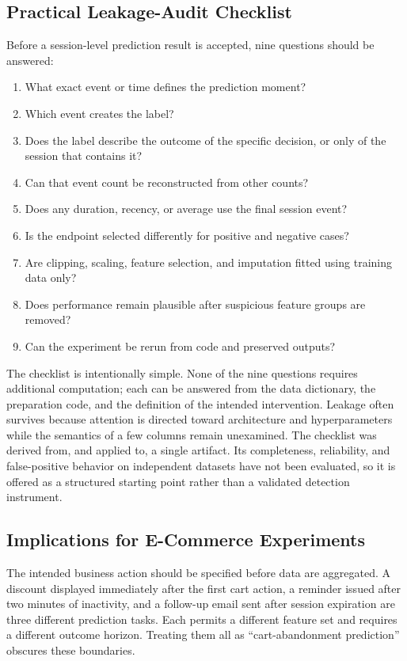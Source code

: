 \documentclass[conference, letterpaper]{IEEEtran}
\begin{document}
\subsection{Practical Leakage-Audit Checklist}
Before a session-level prediction result is accepted, nine questions should be answered:
\begin{enumerate}
    \item What exact event or time defines the prediction moment?
    \item Which event creates the label?
    \item Does the label describe the outcome of the specific decision, or only of the session that contains it?
    \item Can that event count be reconstructed from other counts?
    \item Does any duration, recency, or average use the final session event?
    \item Is the endpoint selected differently for positive and negative cases?
    \item Are clipping, scaling, feature selection, and imputation fitted using training data only?
    \item Does performance remain plausible after suspicious feature groups are removed?
    \item Can the experiment be rerun from code and preserved outputs?
\end{enumerate}
The checklist is intentionally simple. None of the nine questions requires additional computation; each can be answered from the data dictionary, the preparation code, and the definition of the intended intervention. Leakage often survives because attention is directed toward architecture and hyperparameters while the semantics of a few columns remain unexamined. The checklist was derived from, and applied to, a single artifact. Its completeness, reliability, and false-positive behavior on independent datasets have not been evaluated, so it is offered as a structured starting point rather than a validated detection instrument.

\subsection{Implications for E-Commerce Experiments}
The intended business action should be specified before data are aggregated. A discount displayed immediately after the first cart action, a reminder issued after two minutes of inactivity, and a follow-up email sent after session expiration are three different prediction tasks. Each permits a different feature set and requires a different outcome horizon. Treating them all as ``cart-abandonment prediction'' obscures these boundaries.
\end{document}

